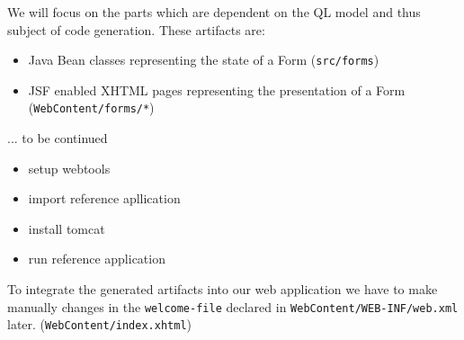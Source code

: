 We will focus on the parts which are dependent on the QL model and thus subject of code generation. These artifacts are:
\begin{itemize}
\item Java Bean classes representing the state of a Form (\texttt{src/forms})
\item JSF enabled XHTML pages representing the presentation of a Form (\texttt{WebContent/forms/*})
\end{itemize}

... to be continued
\begin{itemize}
\item setup webtools
\item import reference apllication
\item install tomcat
\item run reference application
\end{itemize}
To integrate the generated artifacts into our web application we have to
make manually changes in the \texttt{welcome-file} declared in \texttt{WebContent/WEB-INF/web.xml} later.
(\texttt{WebContent/index.xhtml})


